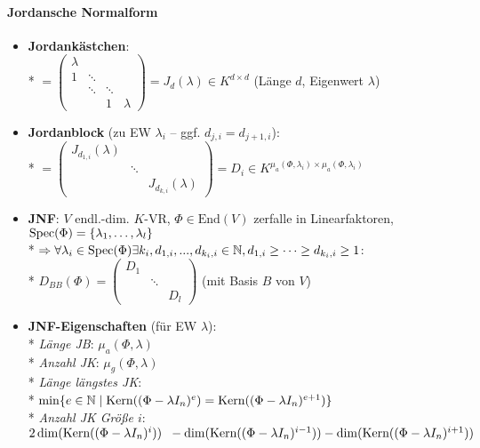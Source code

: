 \paragraph{Jordansche Normalform}
\begin{itemize}
  \item \textbf{Jordankästchen}: \\* \( = \left( \begin{smallmatrix}
    \lambda &  &  &  \\
    1 & \ddots &  &  \\
     & \ddots & \ddots &  \\
      & & 1 & \lambda
  \end{smallmatrix} \right) = J_d(\lambda) \in K^{d \times d} \) (Länge \( d \), Eigenwert \( \lambda \))

  \item \textbf{Jordanblock} (zu EW \( \lambda_i \) -- ggf. \( d_{j,i} = d_{j+1,i} \)): \\*
    \( = \left( \begin{smallmatrix}
      J_{d_{1,i}}(\lambda) & &  \\
       & \ddots & \\
        & & J_{d_{k,i}}(\lambda)
    \end{smallmatrix} \right) = D_i \in K^{\mu_a(\Phi, \lambda_i) \times \mu_a(\Phi, \lambda_i) } \)

  \item \textbf{JNF}: \( V \) endl.-dim. \( K \)-VR, \( \Phi \in \text{End}(V) \) zerfalle in Linearfaktoren, \( \text{Spec}(\Phi) = \{ \lambda_1, \dots, \lambda_l \} \)
    \\*
    \( \Rightarrow \forall \lambda_i \in \text{Spec}(\Phi) \exists k_i, d_{1,i}, ..., d_{k_i,i} \in \mathbb{N}, d_{1,i} \geq \cdots \geq d_{k_i,i} \geq 1 \): 
    \\*
    \( D_{BB}(\Phi) = \left( \begin{smallmatrix}
      D_1 & & \\
       & \ddots & \\
        & & D_l
    \end{smallmatrix} \right) \) (mit Basis \( B \) von \( V \))

  \item \textbf{JNF-Eigenschaften} (für EW \( \lambda \)): \\*
    \emph{Länge JB}: \( \mu_a(\Phi, \lambda) \) \\*
    \emph{Anzahl JK}: \( \mu_g(\Phi, \lambda) \) \\*
    \emph{Länge längstes JK}:  \\* \phantom{x} \( \min\{ e \in \mathbb{N} \mid \text{Kern}((\Phi - \lambda I_n)^e) = \text{Kern}((\Phi - \lambda I_n)^{e+1}) \}  \) \\*
    \emph{Anzahl JK Größe \( i \)}: \( 2\dim(\text{Kern}((\Phi - \lambda I_n)^i)) \\* \phantom{x} - \dim(\text{Kern}((\Phi - \lambda I_n)^{i-1})) - \dim(\text{Kern}((\Phi - \lambda I_n)^{i+1})) \)


\end{itemize}
